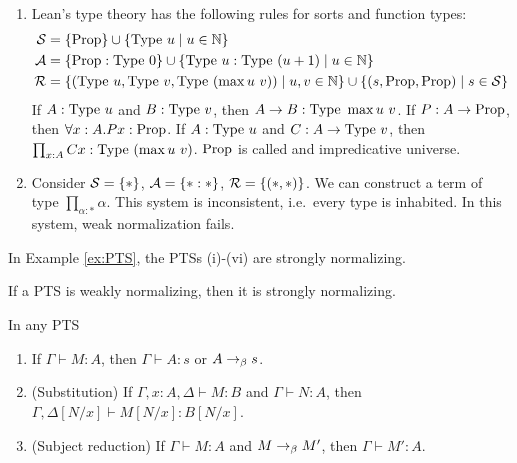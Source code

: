 \begin{example}
\begin{enumerate}
{        }
        \item{
            Lean's type theory has the following rules for sorts and function types: 
            \begin{align*}
                \fS &= \{\proptype\} \cup \{ \typeu{u} \mid u \in \bN\} \\
                \fA &= \{\proptype : \typeu{0}\} \cup \{\typeu{u} : \typeu{(u + 1)} \mid u \in \bN\} \\
                \fR &= \{ (\typeu{u}, \typeu{v}, \typeu{(\max u\ v)}) \mid u,v \in \bN\} \cup \{(s, \proptype, \proptype) \mid s \in \fS\}
            \end{align*}
            If $A : \mathrm{Type}\ u$ and $B : \mathrm{Type}\ v$, then $A \to B : \mathrm{Type}\ \max u\ v$.
            If $P : A \to \mathrm{Prop}$, then $\forall x : A. Px : \mathrm{Prop}$. 
            If $A : \mathrm{Type}\ u$ and $C : A \to \mathrm{Type}\ v$, then $\prod_{x : A} Cx : \mathrm{Type}\ (\max u \ v)$.
            $\mathrm{Prop}$ is called and \alert{impredicative universe}.
        }
        \item {
            Consider $\mathcal{S} = \{*\}$, $\mathcal{A} = \{* :*\}$, $\mathcal{R} = \{(*, *)\}$. 
            We can construct a term of type $\prod_{\alpha : *} \alpha$. 
            This system is \alert{inconsistent}, i.e.\ every type is inhabited. 
            In this system, weak normalization fails. 
        }
    \end{enumerate}
\end{example}

\begin{boxthm}
    In Example \ref{ex:PTS}, the PTSs (i)-(vi) are strongly normalizing.
\end{boxthm}

\begin{conj}
    If a PTS is weakly normalizing, then it is strongly normalizing. 
\end{conj}

\begin{boxprop}\label{prop:PTS}
    In any PTS 
    \begin{enumerate}
        \item If $\Gamma \vdash M : A$, then $\Gamma \vdash A : s$ or $A \to_{\beta} s$.
        \item (Substitution) If $\Gamma, x : A, \Delta \vdash M : B$ and $\Gamma \vdash N : A$, then $\Gamma, \Delta[N/x] \vdash M[N/x] : B[N/x]$.
        \item (Subject reduction) If $\Gamma \vdash M : A$ and $M \to_{\beta} M'$, then $\Gamma \vdash M' : A$.
    \end{enumerate}
\end{boxprop}

